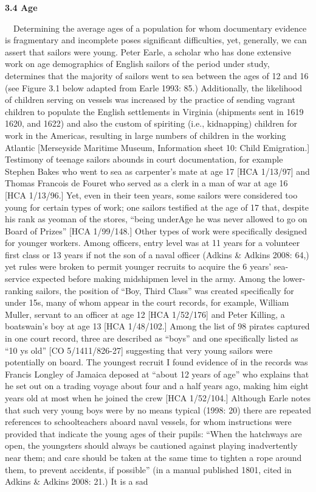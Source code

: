 \begin{styleStandard}
\textbf{3.4 Age}
\end{styleStandard}

\begin{styleStandard}
\ \ Determining the average ages of a population for whom documentary evidence is fragmentary and incomplete poses significant difficulties, yet, generally, we can assert that sailors were young. Peter Earle, a scholar who has done extensive work on age demographics of English sailors of the period under study, determines that the majority of sailors went to sea between the ages of 12 and 16 (see Figure 3.1 below adapted from Earle 1993: 85.) Additionally, the likelihood of children serving on vessels was increased by the practice of sending vagrant children to populate the English settlements in Virginia (shipments sent in 1619 1620, and 1622) and also the custom of spiriting (i.e., kidnapping) children for work in the Americas, resulting in large numbers of children in the working Atlantic [Merseyside Maritime Museum, Information sheet 10: Child Emigration.] Testimony of teenage sailors abounds in court documentation, for example Stephen Bakes who went to sea as carpenter’s mate at age 17 [HCA 1/13/97] and Thomas Francois de Fouret who served as a clerk in a man of war at age 16 [HCA 1/13/96.] Yet, even in their teen years, some sailors were considered too young for certain types of work; one sailors testified at the age of 17 that, despite his rank as yeoman of the stores, “being underAge he was never allowed to go on Board of Prizes” [HCA 1/99/148.] Other types of work were specifically designed for younger workers. Among officers, entry level was at 11 years for a volunteer first class or 13 years if not the son of a naval officer (Adkins \& Adkins 2008: 64,) yet rules were broken to permit younger recruits to acquire the 6 years’ sea-service expected before making midshipmen level in the army. Among the lower-ranking sailors, the position of “Boy, Third Class” was created specifically for under 15s, many of whom appear in the court records, for example, William Muller, servant to an officer at age 12 [HCA 1/52/176] and Peter Killing, a boatswain's boy at age 13 [HCA 1/48/102.] Among the list of 98 pirates captured in one court record, three are described as “boys” and one specifically listed as “10 ys old” [CO 5/1411/826-27] suggesting that very young sailors were potentially on board. The youngest recruit I found evidence of in the records was Francis Longley of Jamaica deposed at “about 12 years of age” who explains that he set out on a trading voyage about four and a half years ago, making him eight years old at most when he joined the crew [HCA 1/52/104.] Although Earle notes that such very young boys were by no means typical (1998: 20) there are repeated references to schoolteachers aboard naval vessels, for whom instructions were provided that indicate the young ages of their pupils: “When the hatchways are open, the youngsters should always be cautioned against playing inadvertently near them; and care should be taken at the same time to tighten a rope around them, to prevent accidents, if possible” (in a manual published 1801, cited in Adkins \& Adkins 2008: 21.) It is a sad 
\end{styleStandard}
